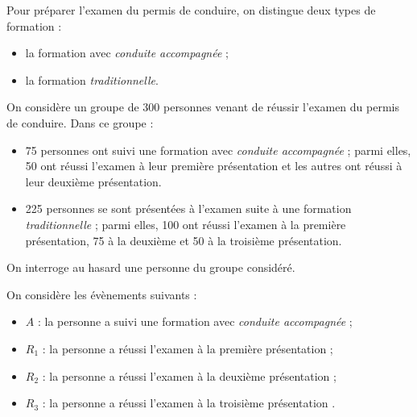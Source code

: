 \medskip

Pour préparer l'examen du permis de conduire, on distingue deux types de formation :

\begin{itemize}
\item la formation avec \emph{conduite accompagnée} ;
\item la formation \emph{traditionnelle}.
\end{itemize}

On considère un groupe de 300 personnes venant de réussir l'examen du permis de conduire. Dans ce groupe :

\begin{itemize}
\item 75 personnes ont suivi une formation avec \emph{conduite accompagnée} ; parmi elles, 50 ont réussi l'examen à leur première présentation et les autres ont réussi à leur deuxième présentation.
\item  225 personnes se sont présentées à l'examen suite à une formation \emph{traditionnelle} ; parmi elles, 100 ont réussi l'examen à la première présentation, 75 à la deuxième et 50 à la troisième présentation.
\end{itemize}

On interroge au hasard une personne du groupe considéré.

On considère les évènements suivants :
\begin{itemize}
\item [] $A$ : \og la personne a suivi une formation avec \emph{conduite accompagnée} \fg{} ;
\item [] $R_1$ : \og la personne a réussi l'examen à la première présentation \fg{} ;
\item []$R_2$ : \og la personne a réussi l'examen à la deuxième présentation \fg{} ;
\item []$R_3$ : \og la personne a réussi l'examen à la troisième présentation \fg.
\end{itemize}

\medskip

